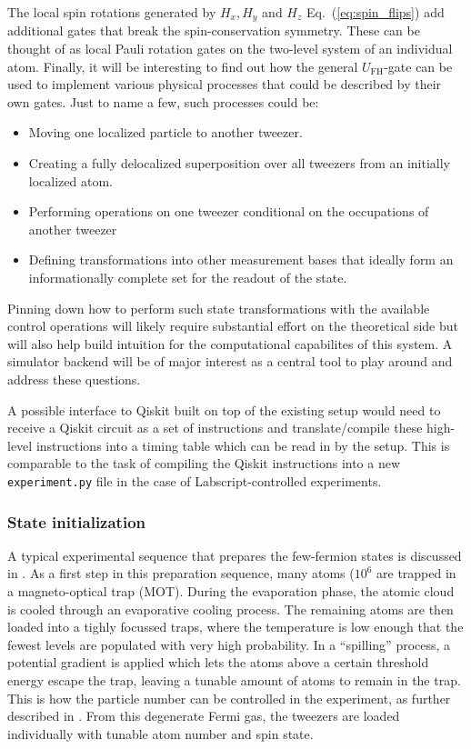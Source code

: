 \documentclass[a4paper, 10pt]{article}
\begin{document}
    The local spin rotations generated by $H_x, H_y$ and $H_z$ Eq.~(\ref{eq:spin_flips}) add additional gates that break the spin-conservation symmetry.
    These can be thought of as local Pauli rotation gates on the two-level system of an individual atom.
    Finally, it will be interesting to find out how the general $U_{\text{FH}}$-gate can be used to implement various physical processes that could be described by their own gates.
    Just to name a few, such processes could be:
    
    \begin{itemize}
        \item Moving one localized particle to another tweezer. 
        \item Creating a fully delocalized superposition over all tweezers from an initially localized atom. 
        \item Performing operations on one tweezer conditional on the occupations of another tweezer 
        \item Defining transformations into other measurement bases that ideally form an informationally complete set for the readout of the state. 
    \end{itemize}
    
    Pinning down how to perform such state transformations with the available control operations will likely require substantial effort on the theoretical side but will also help build intuition for the computational capabilites of this system.
    A simulator backend will be of major interest as a central tool to play around and address these questions.
    
    A possible interface to Qiskit built on top of the existing setup would need to receive a Qiskit circuit as a set of instructions and translate/compile these high-level instructions into a timing table which can be read in by the setup.
    This is comparable to the task of compiling the Qiskit instructions into a new \texttt{experiment.py} file in the case of Labscript-controlled experiments.
    
    \subsubsection{State initialization}
    
    A typical experimental sequence that prepares the few-fermion states is discussed in \cite{becher2020characterizing}.
    As a first step in this preparation sequence, many atoms ($10^6$ are trapped in a magneto-optical trap (MOT).
    During the evaporation phase, the atomic cloud is cooled through an evaporative cooling process.
    The remaining atoms are then loaded into a tighly focussed traps, where the temperature is low enough that the fewest levels are populated with very high probability.
    In a ``spilling'' process, a potential gradient is applied which lets the atoms above a certain threshold energy escape the trap, leaving a tunable amount of atoms to remain in the trap.
    This is how the particle number can be controlled in the experiment, as further described in \cite{serwane2011deterministic}.
    From this degenerate Fermi gas, the tweezers are loaded individually with tunable atom number and spin state. 
    
\end{document}
